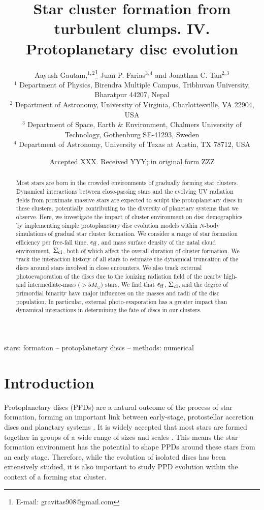 \documentclass[fleqn,usenatbib]{mnras}
\title[Disc evolution in star clusters]{Star cluster formation from turbulent clumps. IV.  Protoplanetary disc evolution}
\author[Gautam et al.]{
Aayush Gautam,$^{1,2}$\thanks{E-mail: gravitas908@gmail.com}
Juan P. Farias$^{3,4}$
and Jonathan C. Tan$^{2,3}$
\\
$^{1}$ Department of Physics, Birendra Multiple Campus, Tribhuvan University, Bharatpur 44207, Nepal \\
$^{2}$ Department of Astronomy, University of Virginia, Charlottesville, VA 22904, USA\\
$^{3}$ Department of Space, Earth \& Environment, Chalmers University of Technology, Gothenburg SE-41293, Sweden \\
$^{4}$ Department of Astronomy, University of Texas at Austin, TX 78712, USA
}
\date{Accepted XXX. Received YYY; in original form ZZZ}
\begin{document}
\label{firstpage}
\pagerange{\pageref{firstpage}--\pageref{lastpage}}
\maketitle

\begin{abstract}
Most stars are born in the crowded environments of gradually forming star clusters. Dynamical interactions between close-passing stars and the evolving UV radiation fields from proximate massive stars are expected to sculpt the protoplanetary discs in these clusters, potentially contributing to the diversity of planetary systems that we observe. Here, we investigate the impact of cluster environment on disc demographics by implementing simple protoplanetary disc evolution models within $N$-body simulations of gradual star cluster formation. We consider a range of star formation efficiency per free-fall time, $\epsilon_{\rm ff}$, and mass surface density of the natal cloud environment, $\Sigma_{\rm cl}$, both of which affect the overall duration of cluster formation. We track the interaction history of all stars to estimate the dynamical truncation of the discs around stars involved in close encounters. We also track external photoevaporation of the discs due to the ionizing radiation field of the nearby high- and intermediate-mass ($> 5 M_\odot$) stars. We find that $\epsilon_{\rm ff}$, $\Sigma_{\rm cl}$, and the degree of primordial binarity have major influences on the masses and radii of the disc population. In particular, external photo-evaporation has a greater impact than dynamical interactions in determining the fate of discs in our clusters. 
\end{abstract}

\begin{keywords}
stars: formation -- protoplanetary discs -- methods: numerical
\end{keywords}



\section{Introduction}
\label{sec:intro}

Protoplanetary discs (PPDs) are a natural outcome of the process of star formation, forming an important link between early-stage, protostellar accretion discs and planetary systems \citep{Williams2011ARA&A..49...67W,Andrews2020ARA&A..58..483A}. It is widely accepted that most stars are formed together in groups of a wide range of sizes and scales \citep{Lada2003ARA&A..41...57L, Gutermuth2009ApJS..184...18G}. This means the star formation environment has the potential to shape PPDs around these stars from an early stage. Therefore, while the evolution of isolated discs has been extensively studied, it is also important to study PPD evolution within the context of a forming star cluster. 
\end{document}
